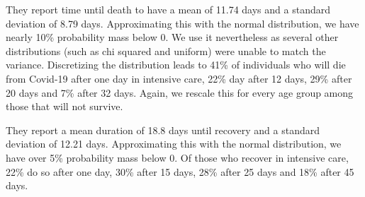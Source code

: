 They report time until death to have a mean of 11.74 days and a standard deviation of
8.79 days. Approximating this with the normal distribution, we have nearly 10\%
probability mass below 0. We use it nevertheless as several other distributions (such as
chi squared and uniform) were unable to match the variance. Discretizing the
distribution leads to 41\% of individuals who will die from Covid-19 after one day in
intensive care, 22\% day after 12 days, 29\% after 20 days and 7\% after 32 days. Again,
we rescale this for every age group among those that will not survive.

They report a mean duration of 18.8 days until recovery and a standard deviation of
12.21 days. Approximating this with the normal distribution, we have over 5\%
probability mass below 0. Of those who recover in intensive care, 22\% do so
after one day, 30\% after 15 days, 28\% after 25 days and 18\% after 45 days.
